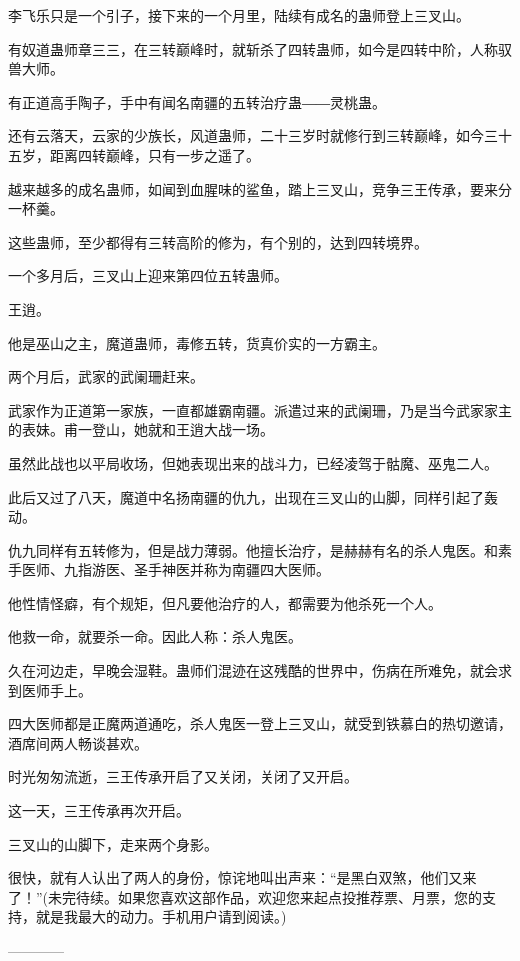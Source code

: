 \begin{this_body}
李飞乐只是一个引子，接下来的一个月里，陆续有成名的蛊师登上三叉山。

有奴道蛊师章三三，在三转巅峰时，就斩杀了四转蛊师，如今是四转中阶，人称驭兽大师。

有正道高手陶子，手中有闻名南疆的五转治疗蛊――灵桃蛊。

还有云落天，云家的少族长，风道蛊师，二十三岁时就修行到三转巅峰，如今三十五岁，距离四转巅峰，只有一步之遥了。

越来越多的成名蛊师，如闻到血腥味的鲨鱼，踏上三叉山，竞争三王传承，要来分一杯羹。

这些蛊师，至少都得有三转高阶的修为，有个别的，达到四转境界。

一个多月后，三叉山上迎来第四位五转蛊师。

王逍。

他是巫山之主，魔道蛊师，毒修五转，货真价实的一方霸主。

两个月后，武家的武阑珊赶来。

武家作为正道第一家族，一直都雄霸南疆。派遣过来的武阑珊，乃是当今武家家主的表妹。甫一登山，她就和王逍大战一场。

虽然此战也以平局收场，但她表现出来的战斗力，已经凌驾于骷魔、巫鬼二人。

此后又过了八天，魔道中名扬南疆的仇九，出现在三叉山的山脚，同样引起了轰动。

仇九同样有五转修为，但是战力薄弱。他擅长治疗，是赫赫有名的杀人鬼医。和素手医师、九指游医、圣手神医并称为南疆四大医师。

他性情怪癖，有个规矩，但凡要他治疗的人，都需要为他杀死一个人。

他救一命，就要杀一命。因此人称：杀人鬼医。

久在河边走，早晚会湿鞋。蛊师们混迹在这残酷的世界中，伤病在所难免，就会求到医师手上。

四大医师都是正魔两道通吃，杀人鬼医一登上三叉山，就受到铁慕白的热切邀请，酒席间两人畅谈甚欢。

时光匆匆流逝，三王传承开启了又关闭，关闭了又开启。

这一天，三王传承再次开启。

三叉山的山脚下，走来两个身影。

很快，就有人认出了两人的身份，惊诧地叫出声来：“是黑白双煞，他们又来了！”(未完待续。如果您喜欢这部作品，欢迎您来起点投推荐票、月票，您的支持，就是我最大的动力。手机用户请到阅读。)

------------

\end{this_body}

